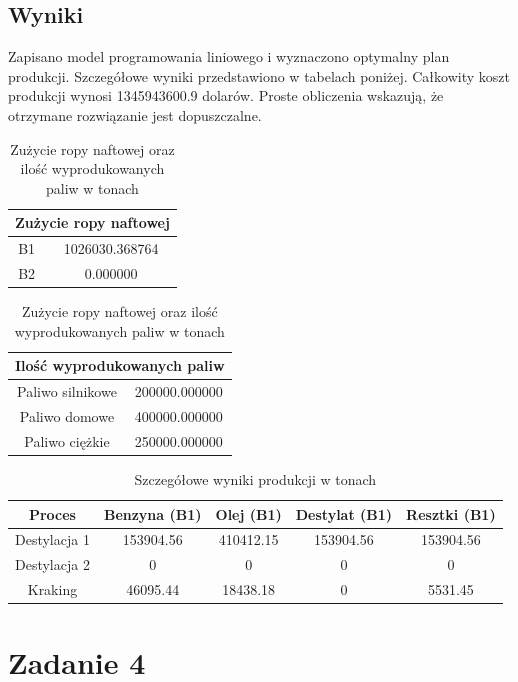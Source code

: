 \documentclass{article}
\begin{document}
\subsection{Wyniki}
Zapisano model programowania liniowego i wyznaczono optymalny plan produkcji. Szczegółowe wyniki przedstawiono w tabelach poniżej. Całkowity koszt produkcji wynosi 1345943600.9 dolarów.
Proste obliczenia wskazują, że otrzymane rozwiązanie jest dopuszczalne.
\begin{table}[h!]
    \centering
    \begin{tabular}{c|c} 
        \multicolumn{2}{c}{Zużycie ropy naftowej} \\ \hline
        B1 & 1026030.368764 \\ 
        B2 & 0.000000 \\ 
    \end{tabular}
    \hspace{2cm}
    \begin{tabular}{c|c} 
        \multicolumn{2}{c}{Ilość wyprodukowanych paliw} \\ \hline
        Paliwo silnikowe & 200000.000000 \\ 
        Paliwo domowe & 400000.000000 \\ 
        Paliwo ciężkie & 250000.000000 \\ 
    \end{tabular}
    \caption{Zużycie ropy naftowej oraz ilość wyprodukowanych paliw w tonach}
    \label{tab:zuzycie_i_produkcja}
\end{table}
\begin{table}[h!]
    \centering
    \begin{tabular}{c|cccc}
        Proces     & Benzyna (B1)       & Olej (B1)         & Destylat (B1)      & Resztki (B1)       \\
        \hline
        Destylacja 1& 153904.56         & 410412.15        & 153904.56         & 153904.56         \\
        Destylacja 2& 0         & 0        & 0         & 0         \\
        Kraking      & 46095.44          & 18438.18         & 0                 & 5531.45           \\
    \end{tabular}
    \caption{Szczegółowe wyniki produkcji w tonach}
    \label{tab:przeplyw_wyjscia_zbiorniki}
\end{table}

\section{Zadanie 4}
\end{document}
